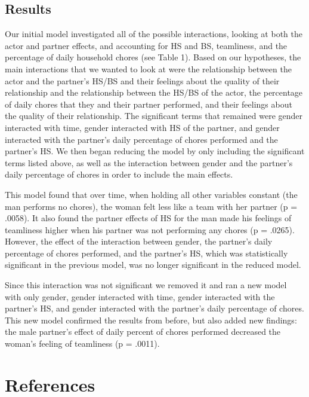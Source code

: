 \documentclass[
  english,
  man]{apa6}
\begin{document}
\hypertarget{results-1}{%
\subsection{Results}\label{results-1}}

Our initial model investigated all of the possible interactions, looking at both the actor and partner effects, and accounting for HS and BS, teamliness, and the percentage of daily household chores (see Table 1). Based on our hypotheses, the main interactions that we wanted to look at were the relationship between the actor and the partner's HS/BS and their feelings about the quality of their relationship and the relationship between the HS/BS of the actor, the percentage of daily chores that they and their partner performed, and their feelings about the quality of their relationship. The significant terms that remained were gender interacted with time, gender interacted with HS of the partner, and gender interacted with the partner's daily percentage of chores performed and the partner's HS. We then began reducing the model by only including the significant terms listed above, as well as the interaction between gender and the partner's daily percentage of chores in order to include the main effects.

This model found that over time, when holding all other variables constant (the man performs no chores), the woman felt less like a team with her partner (p = .0058). It also found the partner effects of HS for the man made his feelings of teamliness higher when his partner was not performing any chores (p = .0265). However, the effect of the interaction between gender, the partner's daily percentage of chores performed, and the partner's HS, which was statistically significant in the previous model, was no longer significant in the reduced model.

Since this interaction was not significant we removed it and ran a new model with only gender, gender interacted with time, gender interacted with the partner's HS, and gender interacted with the partner's daily percentage of chores. This new model confirmed the results from before, but also added new findings: the male partner's effect of daily percent of chores performed decreased the woman's feeling of teamliness (p = .0011).

\newpage

\hypertarget{references}{%
\section{References}\label{references}}
\end{document}
